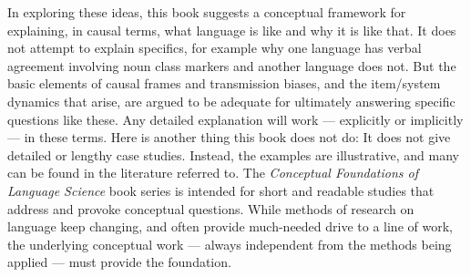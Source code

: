 In exploring these ideas, this book suggests a conceptual framework for explaining, in causal terms, what language is like and why it is like that. It does not attempt to explain specifics, for example why one language has verbal agreement involving noun class markers and another language does not. But the basic elements of causal frames and transmission biases, and the item/system dynamics that arise, are argued to be adequate for ultimately answering specific questions like these. Any detailed explanation will work --- explicitly or implicitly --- in these terms. Here is another thing this book does not do: It does not give detailed or lengthy case studies. Instead, the examples are illustrative, and many can be found in the literature referred to. The \textit{Conceptual Foundations of Language Science} book series is intended for short and readable studies that address and provoke conceptual questions. While methods of research on language keep changing, and often provide much-needed drive to a line of work, the underlying conceptual work --- always independent from the methods being applied --- must provide the foundation.
